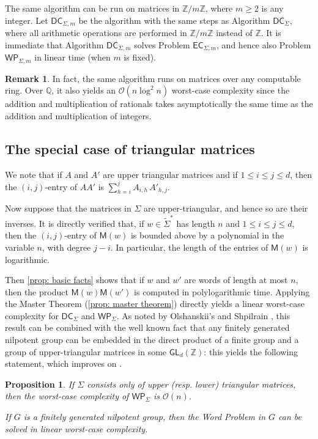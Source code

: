 \documentclass{article}
\def\alph{\tilde{\Sigma}}
\def\O{\mathcal{O}}
\def\Q{\mathbb{Q}}
\def\Z{\mathbb{Z}}
\def\GL{\textsf{GL}}
\def\DC{\textsf{DC}}
\def\EC{\textsf{EC}}
\def\WP{\textsf{WP}}
\def\mat{\textsf{M}}
\theoremstyle{plain}
\newtheorem{proposition}[theorem]{Proposition}
\theoremstyle{definition}
\newtheorem{remark}[theorem]{Remark}
\begin{document}
The same algorithm can be run on matrices in $\Z/m\Z$, where $m \ge 2$ is any integer. Let $\DC_{\Sigma,m}$ be the algorithm with the same steps as Algorithm $\DC_\Sigma$, where all arithmetic operations are performed in $\Z/m\Z$ instead of $\Z$. It is immediate that Algorithm $\DC_{\Sigma,m}$ solves Problem $\EC_{\Sigma,m}$, and hence also Problem $\WP_{\Sigma,m}$ in linear time (when $m$ is fixed).

\begin{remark}\label{rk: worst case in other rings}
    In fact, the same algorithm runs on matrices over any computable ring. Over $\Q$, it also yields an $\O(n\log^2n)$ worst-case complexity since the addition and multiplication of rationals takes asymptotically the same time as the addition and multiplication of integers.
\end{remark}



\subsection{The special case of triangular matrices}\label{sec: triangular}

We note that if $A$ and $A'$ are upper triangular matrices and if $1\le i \le j \le d$, then the $(i,j)$-entry of $AA'$ is $\sum_{h=i}^jA_{i,h}\,A'_{h,j}$. 

Now suppose that the matrices in $\Sigma$ are upper-triangular, and hence so are their inverses. It is directly verified that, if $w \in \alph^*$ has length $n$ and $1\le i \le j \le d$, then the $(i,j)$-entry of $\mat(w)$ is bounded above by a polynomial in the variable $n$, with degree $j-i$. In particular, the length of the entries of $\mat(w)$ is logarithmic.

Then \cref{prop: basic facts} shows that if $w$ and $w'$ are words of length at most $n$, then the product $\mat(w)\mat(w')$ is computed in polylogarithmic time. Applying the Master Theorem (\cref{prop: master theorem}) directly yields a linear worst-case complexity for $\DC_\Sigma$ and $\WP_\Sigma$. As noted by Olshanskii's and Shpilrain \cite{2025:OlshShp}, this result can be combined with the well known fact \cite{1938:Hirsch} that any finitely generated nilpotent group can be embedded in the direct product of a finite group and a group of upper-triangular matrices in some $\GL_d(\Z)$: this yields the following statement, which improves on \cite[Theorems 1 and 2]{2025:OlshShp}.

\begin{proposition}\label{prop: upper triangular}
    If $\Sigma$ consists only of upper (resp. lower) triangular matrices, then the worst-case complexity of $\WP_\Sigma$ is $\O(n)$.

    If $G$ is a finitely generated nilpotent group, then the Word Problem in $G$ can be solved in linear worst-case complexity.
\end{proposition}
\end{document}
